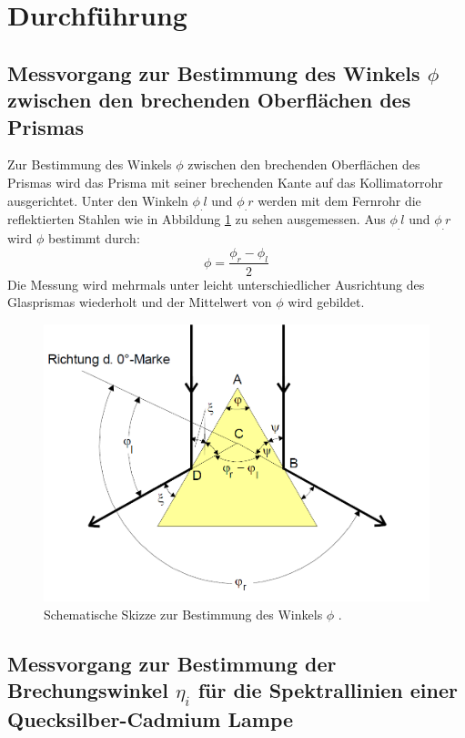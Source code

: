 
\section{Durchführung}
\label{sec:Durchführung}

\subsection{Messvorgang zur Bestimmung des Winkels $\phi$ zwischen den brechenden Oberflächen des Prismas}

Zur Bestimmung des Winkels $\phi$ zwischen den brechenden Oberflächen des Prismas wird das Prisma mit seiner brechenden Kante auf das Kollimatorrohr ausgerichtet. Unter den Winkeln $\phi_.l$ und $\phi_.r$ werden mit dem Fernrohr die reflektierten Stahlen wie in Abbildung \ref{fig:phiMessung} zu sehen ausgemessen. Aus $\phi_.l$ und $\phi_.r$ wird $\phi$ bestimmt durch:
\begin{equation}
\phi = \frac{\phi_r -\phi_l}{2} \label{eq:phi}
\end{equation} 
Die Messung wird mehrmals unter leicht unterschiedlicher Ausrichtung des Glasprismas wiederholt und der Mittelwert von $\phi$ wird gebildet.
 
\begin{figure}
\centering
\includegraphics[width=\linewidth-50pt,height=\textheight-50pt,keepaspectratio]{content/images/phiMessung.png}
\caption{Schematische Skizze zur Bestimmung des Winkels $\phi$ \cite{V402}.}
\label{fig:phiMessung}
\end{figure}

\subsection{Messvorgang zur Bestimmung der Brechungswinkel $\eta_i$ für die Spektrallinien einer Quecksilber-Cadmium Lampe}

